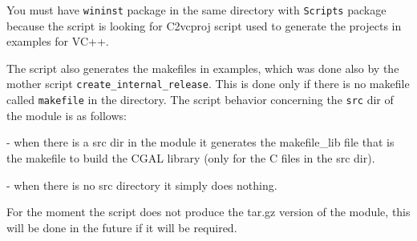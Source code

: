 You must have {\tt wininst} package in the same directory with {\tt Scripts} package because the script is looking for C2vcproj script used to generate the projects in examples for VC++.

The script also generates the makefiles in examples, which was done also by the mother script {\tt create\_internal\_release}. This is done only if there is no makefile called {\tt makefile} in the directory. 
The script behavior concerning the {\tt src} dir of the module is as follows: 

  - when there is a src dir in the module it generates the makefile\_lib file that is the makefile to build the CGAL library (only for the C files in the src dir).     

  - when there is no src directory it simply does nothing.

For the moment the script does not produce the tar.gz version of the module, this will be done in the future if it will be required.
  


